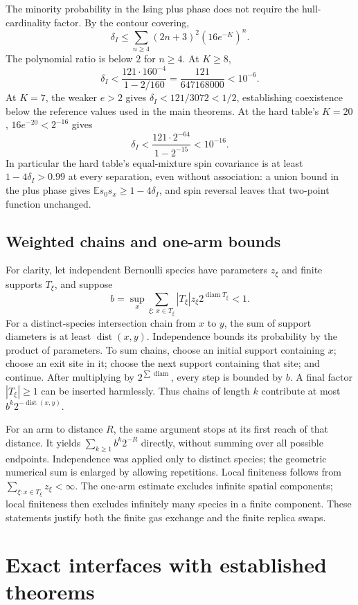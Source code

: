 \documentclass[11pt,reqno]{amsart}
\numberwithin{equation}{section}
\theoremstyle{definition}
\theoremstyle{remark}
\newcommand{\E}{\mathbb E}
\newcommand{\diam}{\operatorname{diam}}
\newcommand{\dist}{\operatorname{dist}}
\begin{document}
The minority probability in the Ising plus phase does not require the hull-cardinality factor. By the contour covering,
\[
 \delta_I\leq\sum_{n\geq4}(2n+3)^2(16e^{-K})^n.
\]
The polynomial ratio is below $2$ for $n\geq4$. At $K\geq8$,
\begin{equation}\label{eq:minority}
 \delta_I<\frac{121\cdot160^{-4}}{1-2/160}
 =\frac{121}{647168000}<10^{-6}.
\end{equation}
At $K=7$, the weaker $e>2$ gives $\delta_I<121/3072<1/2$, establishing coexistence below the reference values used in the main theorems. At the hard table's $K=20$, $16e^{-20}<2^{-16}$ gives
\[
 \delta_I<\frac{121\cdot2^{-64}}{1-2^{-15}}<10^{-16}.
\]
In particular the hard table's equal-mixture spin covariance is at least $1-4\delta_I>0.99$ at every separation, even without association: a union bound in the plus phase gives $\E s_0s_x\geq1-4\delta_I$, and spin reversal leaves that two-point function unchanged.

\subsection{Weighted chains and one-arm bounds}
For clarity, let independent Bernoulli species have parameters $z_\xi$ and finite supports $T_\xi$, and suppose
\[
 b=\sup_x\sum_{\xi:\,x\in T_\xi}|T_\xi|z_\xi2^{\diam T_\xi}<1.
\]
For a distinct-species intersection chain from $x$ to $y$, the sum of support diameters is at least $\dist(x,y)$. Independence bounds its probability by the product of parameters. To sum chains, choose an initial support containing $x$; choose an exit site in it; choose the next support containing that site; and continue. After multiplying by $2^{\sum\diam}$, every step is bounded by $b$. A final factor $|T_\xi|\geq1$ can be inserted harmlessly. Thus chains of length $k$ contribute at most $b^k2^{-\dist(x,y)}$.

For an arm to distance $R$, the same argument stops at its first reach of that distance. It yields $\sum_{k\geq1}b^k2^{-R}$ directly, without summing over all possible endpoints. Independence was applied only to distinct species; the geometric numerical sum is enlarged by allowing repetitions. Local finiteness follows from $\sum_{\xi:x\in T_\xi}z_\xi<\infty$. The one-arm estimate excludes infinite spatial components; local finiteness then excludes infinitely many species in a finite component. These statements justify both the finite gas exchange and the finite replica swaps.


\section{Exact interfaces with established theorems}\label{app:imports}
\end{document}
